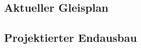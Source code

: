 \subsection{Aktueller Gleisplan}
\label{sec:map_date}



\subsection{Projektierter Endausbau}
\label{sec:map_final_projected}


